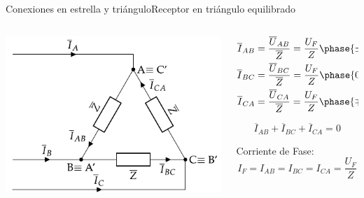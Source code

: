 \documentclass[aspectratio=169, xcolor={usenames,svgnames,dvipsnames}]{beamer}
\begin{document}
\begin{frame}{Conexiones en estrella y triángulo}{Receptor en triángulo equilibrado}
\begin{columns}
\begin{column}{0.5\columnwidth}
\begin{center}
\includegraphics[width=.9\linewidth]{../figs/TrianguloEquilibrado_Receptor.pdf}
\end{center}
\end{column}

\begin{column}{0.5\columnwidth}
\begin{align*}
  \overline{I}_{AB} &= \frac{\overline{U}_{AB}}{\overline{Z}} = \frac{U_F}{Z}\phase{\ang{\pm 120} - \theta} \\
  \overline{I}_{BC} &= \frac{\overline{U}_{BC}}{\overline{Z}} = \frac{U_F}{Z}\phase{0 - \theta}\\
  \overline{I}_{CA} &= \frac{\overline{U}_{CA}}{\overline{Z}} = \frac{U_F}{Z}\phase{\ang{\mp 120} - \theta}
\end{align*}

\[
   \overline{I}_{AB}  + \overline{I}_{BC} + \overline{I}_{CA}  = 0 
\]

Corriente de Fase:
\[
  \boxed{I_F = {I}_{AB} = {I}_{BC} = {I}_{CA} = \frac{U_F}{Z}}
\]
\end{column}
\end{columns}
\end{frame}
\end{document}
